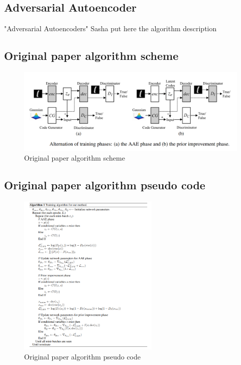 \documentclass{article}
\begin{document}
    \subsection{Adversarial Autoencoder}
    "Adversarial Autoencoders" \cite{DBLP:journals/corr/MakhzaniSJG15}
    Sasha put here the algorithm description


    \subsection{Original paper algorithm scheme}
    \begin{figure}[!h]
        \includegraphics[width=1\textwidth]{figures/original.png}
        \caption{Original paper algorithm scheme}
    \end{figure}

    \subsection{Original paper algorithm pseudo code}
    \begin{figure}[!h]
        \includegraphics[width=0.6\textwidth]{figures/original-code.png}
        \caption{Original paper algorithm pseudo code}
    \end{figure}
\end{document}
